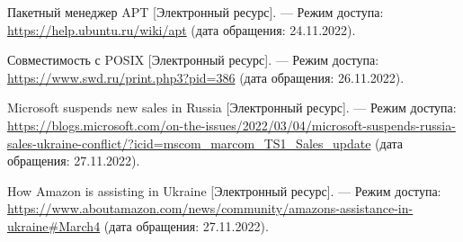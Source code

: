 \begin{thebibliography}{}
	Пакетный менеджер APT [Электронный ресурс]. — Режим доступа: \url{https://help.ubuntu.ru/wiki/apt} (дата обращения: 24.11.2022).
	
	Совместимость с POSIX [Электронный ресурс]. — Режим доступа: \url{https://www.swd.ru/print.php3?pid=386} (дата обращения:
	26.11.2022).
	
	Microsoft suspends new sales in Russia [Электронный ресурс]. —
	Режим доступа: \url{https://blogs.microsoft.com/on-the-issues/2022/03/04/microsoft-suspends-russia-sales-ukraine-conflict/?icid=mscom_marcom_TS1_Sales_update} (дата обращения: 27.11.2022).
	
	How Amazon is assisting in Ukraine [Электронный ресурс]. — Режим доступа: \url{https://www.aboutamazon.com/news/community/amazons-assistance-in-ukraine\#March4} (дата обращения: 27.11.2022).
\end{thebibliography}
\endgroup

\pagebreak